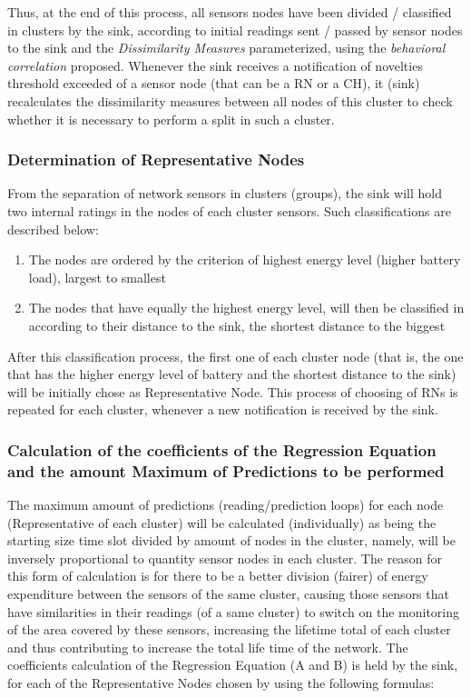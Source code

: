 \documentclass[conference]{IEEEtran}
\begin{document}
Thus, at the end of this process, all sensors nodes have been divided /
classified in clusters by the sink, according to initial readings sent / passed
by sensor nodes to the sink and the \textit{Dissimilarity Measures}
parameterized, using the \textit{behavioral correlation} proposed. Whenever the
sink receives a notification of novelties threshold exceeded of a sensor node
(that can be a RN or a CH), it (sink) recalculates the dissimilarity measures
between all nodes of this cluster to check whether it is necessary to perform a
split in such a cluster.

\subsubsection{Determination of Representative Nodes}

From the separation of network sensors in clusters (groups), the sink will hold
two internal ratings in the nodes of each cluster sensors. Such classifications
are described below:

\begin{enumerate}
    \item The nodes are ordered by the criterion of highest energy level (higher
    battery load), largest to smallest
    \item The nodes that have equally the highest energy level, will then be
    classified in according to their distance to the sink, the shortest distance
    to the biggest
 \end{enumerate}

After this classification process, the first one of each cluster node (that is,
the one that has the higher energy level of battery and the shortest distance to
the sink) will be initially chose as Representative Node. This process of
choosing of RNs is repeated for each cluster, whenever a new notification is
received by the sink.

\subsubsection{Calculation of the coefficients of the Regression Equation and
the amount Maximum of Predictions to be performed}

The maximum amount of predictions (reading/prediction loops) for each node
(Representative of each cluster) will be calculated (individually) as being the
starting size time slot divided by amount of nodes in the cluster, namely, will
be inversely proportional to quantity sensor nodes in each cluster. The reason
for this form of calculation is for there to be a better division (fairer) of
energy expenditure between the sensors of the same cluster, causing those
sensors that have similarities in their readings (of a same cluster) to switch
on the monitoring of the area covered by these sensors, increasing the lifetime
total of each cluster and thus contributing to increase the total life time of
the network.
The coefficients calculation of the Regression Equation (A and B) is held by the
sink, for each of the Representative Nodes chosen by using the following
formulas:
\end{document}
